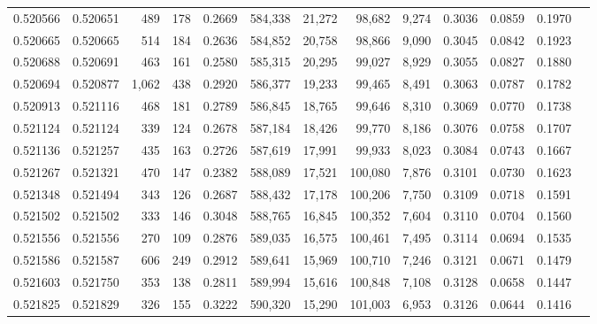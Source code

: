 \begin{tabular}{rrrrrrrrrrrrr}
0.520566 & 0.520651 &   489 &   178 &                                     0.2669 & 584,338 &  21,272 &  98,682 &   9,274 & 0.3036 & 0.0859 & 0.1970 \\
0.520665 & 0.520665 &   514 &   184 &                                     0.2636 & 584,852 &  20,758 &  98,866 &   9,090 & 0.3045 & 0.0842 & 0.1923 \\
0.520688 & 0.520691 &   463 &   161 &                                     0.2580 & 585,315 &  20,295 &  99,027 &   8,929 & 0.3055 & 0.0827 & 0.1880 \\
0.520694 & 0.520877 & 1,062 &   438 &                                     0.2920 & 586,377 &  19,233 &  99,465 &   8,491 & 0.3063 & 0.0787 & 0.1782 \\
0.520913 & 0.521116 &   468 &   181 &                                     0.2789 & 586,845 &  18,765 &  99,646 &   8,310 & 0.3069 & 0.0770 & 0.1738 \\
0.521124 & 0.521124 &   339 &   124 &                                     0.2678 & 587,184 &  18,426 &  99,770 &   8,186 & 0.3076 & 0.0758 & 0.1707 \\
0.521136 & 0.521257 &   435 &   163 &                                     0.2726 & 587,619 &  17,991 &  99,933 &   8,023 & 0.3084 & 0.0743 & 0.1667 \\
0.521267 & 0.521321 &   470 &   147 &                                     0.2382 & 588,089 &  17,521 & 100,080 &   7,876 & 0.3101 & 0.0730 & 0.1623 \\
0.521348 & 0.521494 &   343 &   126 &                                     0.2687 & 588,432 &  17,178 & 100,206 &   7,750 & 0.3109 & 0.0718 & 0.1591 \\
0.521502 & 0.521502 &   333 &   146 &                                     0.3048 & 588,765 &  16,845 & 100,352 &   7,604 & 0.3110 & 0.0704 & 0.1560 \\
0.521556 & 0.521556 &   270 &   109 &                                     0.2876 & 589,035 &  16,575 & 100,461 &   7,495 & 0.3114 & 0.0694 & 0.1535 \\
0.521586 & 0.521587 &   606 &   249 &                                     0.2912 & 589,641 &  15,969 & 100,710 &   7,246 & 0.3121 & 0.0671 & 0.1479 \\
0.521603 & 0.521750 &   353 &   138 &                                     0.2811 & 589,994 &  15,616 & 100,848 &   7,108 & 0.3128 & 0.0658 & 0.1447 \\
0.521825 & 0.521829 &   326 &   155 &                                     0.3222 & 590,320 &  15,290 & 101,003 &   6,953 & 0.3126 & 0.0644 & 0.1416 \\

\end{tabular}
